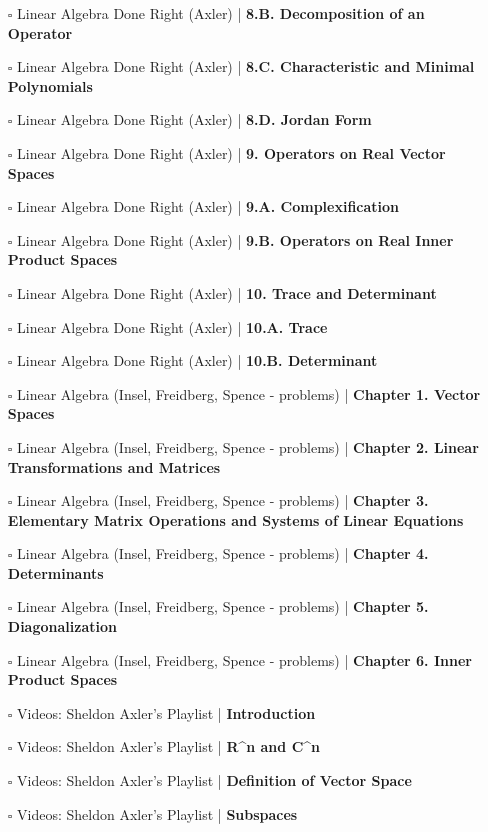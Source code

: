 \documentclass[a4, landscape, 12pt]{article}
\newcommand{\checkbox}{$\square$}%
\begin{document}
\begin{itemize}
{}
\item [\checkbox] Linear Algebra Done Right (Axler)  | \textbf{8.B. Decomposition of an Operator
}
\item [\checkbox] Linear Algebra Done Right (Axler)  | \textbf{8.C. Characteristic and Minimal Polynomials
}
\item [\checkbox] Linear Algebra Done Right (Axler)  | \textbf{8.D. Jordan Form
}
\item [\checkbox] Linear Algebra Done Right (Axler)  | \textbf{9. Operators on Real Vector Spaces
}
\item [\checkbox] Linear Algebra Done Right (Axler)  | \textbf{9.A. Complexification
}
\item [\checkbox] Linear Algebra Done Right (Axler)  | \textbf{9.B. Operators on Real Inner Product Spaces
}
\item [\checkbox] Linear Algebra Done Right (Axler)  | \textbf{10. Trace and Determinant
}
\item [\checkbox] Linear Algebra Done Right (Axler)  | \textbf{10.A. Trace
}
\item [\checkbox] Linear Algebra Done Right (Axler)  | \textbf{10.B. Determinant
}
\item [\checkbox] Linear Algebra (Insel, Freidberg, Spence - problems)  | \textbf{Chapter 1. Vector Spaces
}
\item [\checkbox] Linear Algebra (Insel, Freidberg, Spence - problems)  | \textbf{Chapter 2. Linear Transformations and Matrices
}
\item [\checkbox] Linear Algebra (Insel, Freidberg, Spence - problems)  | \textbf{Chapter 3. Elementary Matrix Operations and Systems of Linear Equations
}
\item [\checkbox] Linear Algebra (Insel, Freidberg, Spence - problems)  | \textbf{Chapter 4. Determinants
}
\item [\checkbox] Linear Algebra (Insel, Freidberg, Spence - problems)  | \textbf{Chapter 5. Diagonalization
}
\item [\checkbox] Linear Algebra (Insel, Freidberg, Spence - problems)  | \textbf{Chapter 6. Inner Product Spaces
}
\item [\checkbox] Videos: Sheldon Axler’s Playlist  | \textbf{Introduction
}
\item [\checkbox] Videos: Sheldon Axler’s Playlist  | \textbf{R^n and C^n
}
\item [\checkbox] Videos: Sheldon Axler’s Playlist  | \textbf{Definition of Vector Space
}
\item [\checkbox] Videos: Sheldon Axler’s Playlist  | \textbf{Subspaces
}
\end{itemize}
\end{document}
